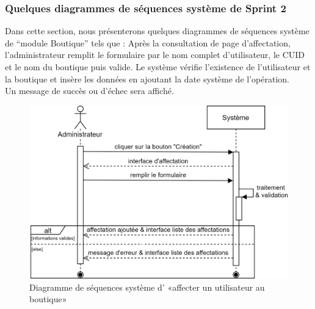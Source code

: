 \subsubsection[Quelques diagrammes de séquences système de Sprint 2]{Quelques diagrammes de séquences système de Sprint 2}
Dans cette section, nous présenterons quelques diagrammes de séquences système de “module Boutique” tels que : 
Après la consultation de page d'affectation, l'administrateur remplit le formulaire par le nom complet d'utilisateur, le CUID et le nom du boutique puis valide. Le système vérifie l'existence de l'utilisateur et la boutique et insère les données en ajoutant la date système de l'opération.\\
Un message de succès ou d'échec sera affiché.
\begin{figure}[H]
	\centering
	\includegraphics[width=0.7\linewidth]{"img/conception/sequences/sprint 2/affectation-system"}
	\caption[Diagramme de séquences système d’ «affecter un utilisateur au boutique»]{Diagramme de séquences système d’ «affecter un utilisateur au boutique»}
	\label{fig:affectation-system}
\end{figure}

